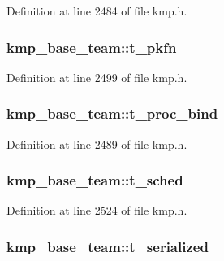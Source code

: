 Definition at line 2484 of file kmp.\-h.

\hypertarget{structkmp__base__team_ae4257d7bf56803599fd7b5db1848dfc2}{
\subsubsection[{t\-\_\-pkfn}]{ kmp\-\_\-base\-\_\-team\-::t\-\_\-pkfn}}\label{structkmp__base__team_ae4257d7bf56803599fd7b5db1848dfc2}


Definition at line 2499 of file kmp.\-h.

\hypertarget{structkmp__base__team_a33becbb653f837bc684f18a9757b5f63}{
\subsubsection[{t\-\_\-proc\-\_\-bind}]{ kmp\-\_\-base\-\_\-team\-::t\-\_\-proc\-\_\-bind}}\label{structkmp__base__team_a33becbb653f837bc684f18a9757b5f63}


Definition at line 2489 of file kmp.\-h.

\hypertarget{structkmp__base__team_af88e8418b231ceff9ce6b29906713a1c}{
\subsubsection[{t\-\_\-sched}]{ kmp\-\_\-base\-\_\-team\-::t\-\_\-sched}}\label{structkmp__base__team_af88e8418b231ceff9ce6b29906713a1c}


Definition at line 2524 of file kmp.\-h.

\hypertarget{structkmp__base__team_af956f01d621369f541f420cc4b43241a}{
\subsubsection[{t\-\_\-serialized}]{ kmp\-\_\-base\-\_\-team\-::t\-\_\-serialized}}\label{structkmp__base__team_af956f01d621369f541f420cc4b43241a}


